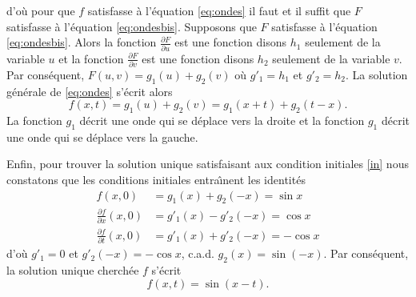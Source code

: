 {{d'o\`u pour que $f$ satisfasse \`a l'\'equation \eqref{eq:ondes} il faut et il suffit que $F$ satisfasse \`a l'\'equation
 \eqref{eq:ondesbis}.
Supposons que $F$ satisfasse \`a l'\'equation \eqref{eq:ondesbis}.
Alors la fonction $\frac{\partial F}{\partial u}$ est une fonction
disons $h_1$ seulement de la variable $u$
et la fonction $\frac{\partial F}{\partial v}$ est une fonction
disons $h_2$ seulement de la variable $v$.
Par cons\'equent,
$F(u,v)= g_1(u)+g_2(v)$ o\`u $g'_1=h_1$ et $g'_2=h_2$.
La solution g\'en\'erale de
\eqref{eq:ondes} s'\'ecrit alors
\[
f(x,t)=g_1(u)+g_2(v)=g_1(x+t)+g_2(t-x) .
\]
La fonction $g_1$ d\'ecrit
une onde qui se d\'eplace vers la droite et 
la fonction $g_1$ d\'ecrit
une onde qui se d\'eplace vers la gauche.

Enfin, pour trouver la solution unique
satisfaisant aux condition initiales \eqref{in} nous constatons que
les conditions initiales entra\^ \i nent les identit\'es
\begin{align*}
f(x,0)&=g_1(x)+g_2(-x)=\sin x
\\
\frac {\partial f}{\partial x}(x,0)&=g'_1(x)-g'_2(-x)=\cos x
\\
\frac {\partial f}{\partial t}(x,0)&=g'_1(x)+g'_2(-x)=-\cos x
\end{align*}
d'o\`u $g'_1=0$ et $g'_2(-x)=-\cos x$, c.a.d. 
$g_2(x)=\sin (-x)$. Par cons\'equent,
la solution unique cherch\'ee $f$ s'\'ecrit
\[
f(x,t)= \sin(x-t).
\]
}
}
